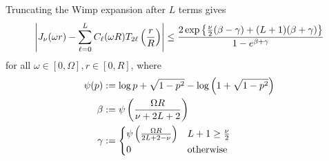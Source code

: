 \begin{lemma} \label{lem:wimp} Truncating the Wimp expansion after $L$ terms
    gives
    \begin{align}
        \left|J_\nu(\omega r) - \sum_{\ell=0}^L C_\ell(\omega R) T_{2\ell}\left( \frac{r}{R} \right)\right| 
        \leq \frac{2\exp\left\{ \frac{\nu}{2}(\beta - \gamma) + (L+1)(\beta + \gamma) \right\}}{1 - e^{\beta + \gamma}}
    \end{align}
    for all $\omega \in [0, \Omega], r \in [0, R]$, where
    \begin{align}
        \psi(p) &:= \log p + \sqrt{1 - p^2} - \log\left( 1 + \sqrt{1 - p^2} \right) \\
        \beta &:= \psi\left( \frac{\Omega R}{\nu + 2L + 2} \right) \\
        \gamma &:= \begin{cases}
            \psi\left( \frac{\Omega R}{2L + 2 - \nu} \right) & L + 1 \geq \frac{\nu}{2} \\
            0 & \textnormal{otherwise}
        \end{cases}
    \end{align}
\end{lemma}
